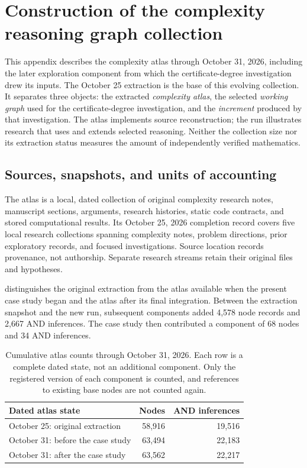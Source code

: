 \section{Construction of the complexity reasoning graph collection}\label{app:complexity-graphs}

This appendix describes the complexity atlas through October 31, 2026, including the later exploration component from which the certificate-degree investigation drew its inputs. The October 25 extraction is the base of this evolving collection. It separates three objects: the extracted \emph{complexity atlas}, the selected \emph{working graph} used for the certificate-degree investigation, and the \emph{increment} produced by that investigation. The atlas implements source reconstruction; the run illustrates research that uses and extends selected reasoning. Neither the collection size nor its extraction status measures the amount of independently verified mathematics.

\subsection{Sources, snapshots, and units of accounting}

The atlas is a local, dated collection of original complexity research notes, manuscript sections, arguments, research histories, static code contracts, and stored computational results. Its October 25, 2026 completion record covers five local research collections spanning complexity notes, problem directions, prior exploratory records, and focused investigations. Source location records provenance, not authorship. Separate research streams retain their original files and hypotheses.

 distinguishes the original extraction from the atlas available when the present case study began and the atlas after its final integration. Between the extraction snapshot and the new run, subsequent components added 4,578 node records and 2,667 AND inferences. The case study then contributed a component of 68 nodes and 34 AND inferences.

\begin{table}[htbp]
\centering\small
\begin{tabularx}{\linewidth}{@{}Yrr@{}}
\toprule
Dated atlas state & Nodes & AND inferences \\
\midrule
October 25: original extraction & 58,916 & 19,516 \\
October 31: before the case study & 63,494 & 22,183 \\
October 31: after the case study & 63,562 & 22,217 \\
\bottomrule
\end{tabularx}
\caption{Cumulative atlas counts through October 31, 2026. Each row is a complete dated state, not an additional component. Only the registered version of each component is counted, and references to existing base nodes are not counted again.}
\label{tab:atlas-evolution}
\end{table}

